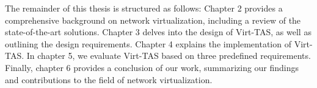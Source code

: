 The remainder of this thesis is structured as follows: Chapter 2
provides a comprehensive background on network virtualization,
including a review of the state-of-the-art solutions. Chapter 3
delves into the design of Virt-TAS, as well as outlining the 
design requirements. Chapter 4 explains the implementation of 
Virt-TAS. In chapter 5, we evaluate Virt-TAS based on three 
predefined requirements. Finally, chapter 6 provides a 
conclusion of our work, summarizing our findings
and contributions to the field of network virtualization.

